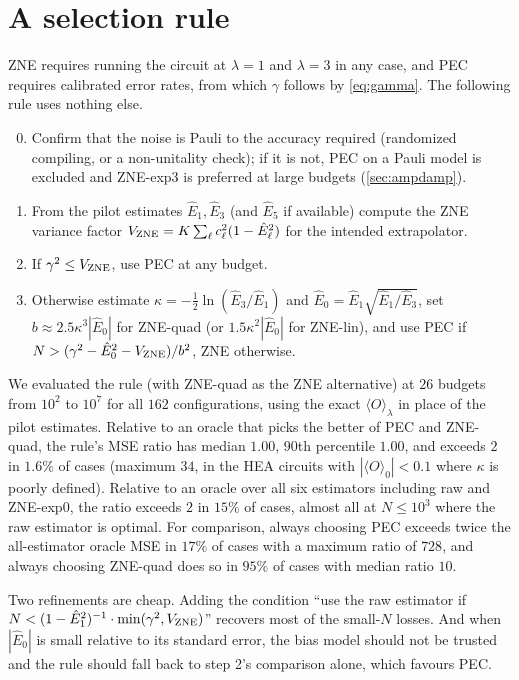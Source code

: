 \documentclass[11pt,a4paper]{article}
\theoremstyle{remark}
\begin{document}
\section{A selection rule}
\label{sec:rule}

ZNE requires running the circuit at $\lambda=1$ and $\lambda=3$ in any case, and PEC requires calibrated error rates, from which $\gamma$ follows by \cref{eq:gamma}. The following rule uses nothing else.

\begin{enumerate}
\setcounter{enumi}{-1}
\item Confirm that the noise is Pauli to the accuracy required (randomized compiling, or a non-unitality check); if it is not, PEC on a Pauli model is excluded and ZNE-exp3 is preferred at large budgets (\cref{sec:ampdamp}).
\item From the pilot estimates $\hat E_1,\hat E_3$ (and $\hat E_5$ if available) compute the ZNE variance factor $V_{\rm ZNE}=K\sum_\ell c_\ell^2(1-\hat E_\ell^2)$ for the intended extrapolator.
\item If $\gamma^2\le V_{\rm ZNE}$, use PEC at any budget.
\item Otherwise estimate $\kappa=-\tfrac12\ln(\hat E_3/\hat E_1)$ and $\hat E_0=\hat E_1\sqrt{\hat E_1/\hat E_3}$, set $b\approx2.5\kappa^3|\hat E_0|$ for ZNE-quad (or $1.5\kappa^2|\hat E_0|$ for ZNE-lin), and use PEC if $N>(\gamma^2-\hat E_0^2-V_{\rm ZNE})/b^2$, ZNE otherwise.
\end{enumerate}

We evaluated the rule (with ZNE-quad as the ZNE alternative) at $26$ budgets from $10^2$ to $10^7$ for all $162$ configurations, using the exact $\langle O\rangle_\lambda$ in place of the pilot estimates. Relative to an oracle that picks the better of PEC and ZNE-quad, the rule's MSE ratio has median $1.00$, 90th percentile $1.00$, and exceeds $2$ in $1.6\%$ of cases (maximum $34$, in the HEA circuits with $|\langle O\rangle_0|<0.1$ where $\kappa$ is poorly defined). Relative to an oracle over all six estimators including raw and ZNE-exp0, the ratio exceeds $2$ in $15\%$ of cases, almost all at $N\le10^3$ where the raw estimator is optimal. For comparison, always choosing PEC exceeds twice the all-estimator oracle MSE in $17\%$ of cases with a maximum ratio of $728$, and always choosing ZNE-quad does so in $95\%$ of cases with median ratio $10$.

Two refinements are cheap. Adding the condition ``use the raw estimator if $N<(1-\hat E_1^2)^{-1}\cdot\min(\gamma^2,V_{\rm ZNE})$'' recovers most of the small-$N$ losses. And when $|\hat E_0|$ is small relative to its standard error, the bias model should not be trusted and the rule should fall back to step 2's comparison alone, which favours PEC.
\end{document}
